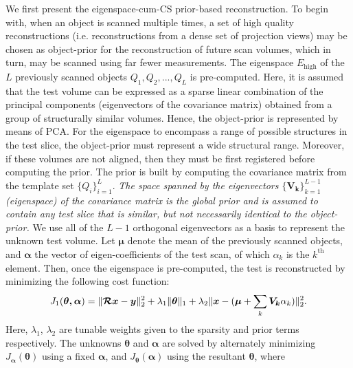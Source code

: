 \documentclass[journal]{IEEEtran}
\begin{document}
We first present the eigenspace-cum-CS prior-based reconstruction. To begin with, when an object is scanned multiple times, a set of high quality reconstructions (i.e. reconstructions from a dense set of projection views) may be chosen as object-prior for the reconstruction of future scan volumes, which in turn, may be scanned using far fewer measurements. The eigenspace $E_{\text{high}}$ of the $L$ previously scanned objects $Q_1,Q_2,...,Q_L$ is pre-computed. Here, it is assumed that the test volume can be expressed as a sparse linear combination of the principal components (eigenvectors of the covariance matrix) obtained from a group of structurally similar volumes. Hence, the object-prior is represented by means of PCA. For the eigenspace to encompass a range of possible structures in the test slice, the object-prior must represent a wide structural range. Moreover, if these volumes are not aligned, then they must be first registered before computing the prior. The prior is built by computing the covariance matrix from the template set $\{Q_i\}_{i=1}^L$. \emph{The space spanned by the eigenvectors $\{\boldsymbol{V_k}\}_{k=1}^{L-1}$ (eigenspace) of the covariance matrix is the global prior and is assumed to contain any test slice that is similar, but not necessarily identical to the object-prior.}  We use all of the $L-1$ orthogonal eigenvectors as a basis to represent the unknown test volume. Let $\boldsymbol{\mu}$ denote the mean of the previously scanned objects, and $\boldsymbol{\alpha}$ the vector of eigen-coefficients of the test scan, of which $\alpha_k$ is the $k^{\textrm{th}}$ element. Then, once the eigenspace is pre-computed, the test is reconstructed by minimizing the following cost function:
\vspace{4mm}
 \begin{equation}
   \setlength{\belowdisplayskip}{0pt} \setlength{\belowdisplayshortskip}{0pt}
\setlength{\abovedisplayskip}{-2pt} \setlength{\abovedisplayshortskip}{-2pt}
J_1(\boldsymbol{\theta,\alpha}) = \lVert\boldsymbol{\mathcal{R} x}- \boldsymbol{y}\rVert_2^2  + \lambda_1\lVert\boldsymbol{\theta}\rVert_1+\lambda_2\lVert\boldsymbol{x} - (\boldsymbol{\mu} + \sum_{k}\boldsymbol{V_k}\alpha_k)\rVert_2^2.
\label{Eq:main_prior}
\end{equation}
Here, $\lambda_1$, $\lambda_2$ are tunable weights given to the sparsity and prior terms respectively. The unknowns $\boldsymbol{\theta}$ and $\boldsymbol{\alpha}$
are solved by alternately minimizing $J_{\boldsymbol{\alpha}}(\boldsymbol{\theta})$ using a fixed $\boldsymbol{\alpha}$, and $J_{\boldsymbol\theta}(\boldsymbol{\alpha})$ using the resultant $\boldsymbol{\theta}$, where 
\end{document}
